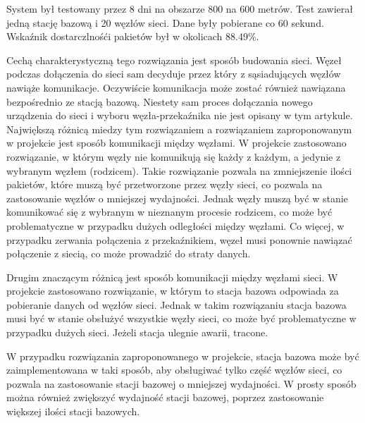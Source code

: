 System był testowany przez 8 dni na obszarze 800 na 600 metrów. Test zawierał jedną stację bazową i 20 węzłów sieci. Dane były pobierane co 60 sekund. Wskaźnik dostarczlnośći pakietów był w okolicach 88.49\%.

Cechą charakterystyczną tego rozwiązania jest sposób budowania sieci. Węzeł podczas dołączenia do sieci sam decyduje przez który z sąsiadujących węzłów nawiąże komunikacje. Oczywiście komunikacja może zostać również nawiązana bezpośrednio ze stacją bazową. Niestety sam proces dołączania nowego urządzenia do sieci i wyboru węzła-przekaźnika nie jest opisany w tym artykule. 
Największą różnicą miedzy tym rozwiązaniem a rozwiązaniem zaproponowanym w projekcie jest sposób komunikacji między węzłami. W projekcie zastosowano rozwiązanie, w którym węzły nie komunikują się każdy z każdym, a jedynie z wybranym węzłem (rodzicem). Takie rozwiązanie pozwala na zmniejszenie ilości pakietów, które muszą być przetworzone przez węzły sieci, co pozwala na zastosowanie węzłów o mniejszej wydajności. Jednak węzły muszą być w stanie komunikować się z wybranym w nieznanym procesie rodzicem, co może być problematyczne w przypadku dużych odległości między węzłami. Co więcej, w przypadku zerwania połączenia z przekaźnikiem, węzeł musi ponownie nawiązać połączenie z siecią, co może prowadzić do straty danych.

Drugim znaczącym różnicą jest sposób komunikacji między węzłami sieci. W projekcie zastosowano rozwiązanie, w którym to stacja bazowa odpowiada za pobieranie danych od węzłów sieci. Jednak w takim rozwiązaniu stacja bazowa musi być w stanie obsłużyć wszystkie węzły sieci, co może być problematyczne w przypadku dużych sieci. Jeżeli stacja ulegnie awarii, tracone.

W przypadku rozwiązania zaproponowanego w projekcie, stacja bazowa może być zaimplementowana w taki sposób, aby obsługiwać tylko część węzłów sieci, co pozwala na zastosowanie stacji bazowej o mniejszej wydajności. W prosty sposób można również zwiększyć wydajność stacji bazowej, poprzez zastosowanie większej ilości stacji bazowych.

